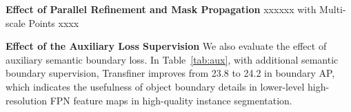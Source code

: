 \documentclass[10pt,twocolumn,letterpaper]{article}
\newcommand{\parsection}[1]{\vspace{1mm}\noindent\textbf{#1}}
\begin{document}
\begin{table}[!h]
	\caption{Effect of the auxiliary semantic boundary supervision.}
	\vspace{-0.1in}
	\centering
	\vspace{-0.1in}
	\label{tab:aux}
\end{table}

\parsection{Effect of Parallel Refinement and Mask Propagation}
xxxxxx
with Multi-scale Points
xxxx

\begin{table}[!h]
	\caption{Effect of the parallel refinement and mask propagation.}
	\vspace{-0.1in}
	\centering
	\vspace{-0.1in}
	\label{tab:prop}
\end{table}

\parsection{Effect of the Auxiliary Loss Supervision} 
We also evaluate the effect of auxiliary semantic boundary loss. In Table~\ref{tab:aux}, with additional semantic boundary supervision, Transfiner improves from 23.8 to 24.2 in boundary AP, which indicates the usefulness of object boundary details in lower-level high-resolution FPN feature maps in high-quality instance segmentation.
\end{document}
